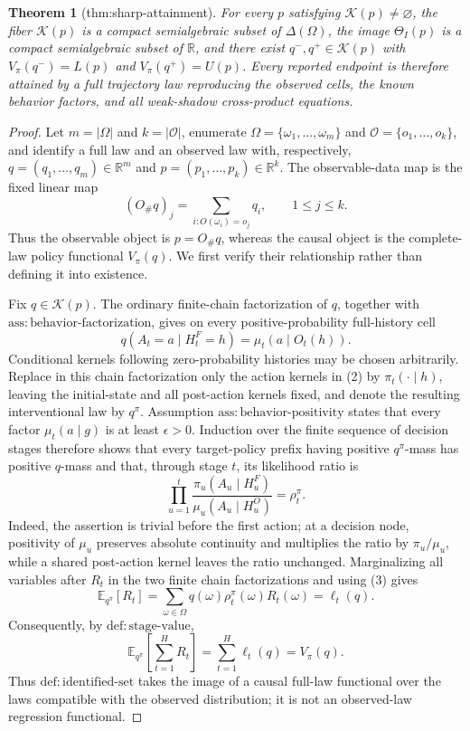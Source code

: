 \documentclass{article}
\newtheorem{theorem}{Theorem}
\begin{document}
\begin{theorem}[thm:sharp-attainment]\label{thm:sharp-attainment}
For every \(p\) satisfying \(\mathcal K(p)\ne\varnothing\), the fiber \(\mathcal K(p)\) is a compact semialgebraic subset of \(\Delta(\Omega)\), the image \(\Theta_I(p)\) is a compact semialgebraic subset of \(\mathbb R\), and there exist \(q^-,q^+\in\mathcal K(p)\) with \(V_\pi(q^-)=L(p)\) and \(V_\pi(q^+)=U(p)\). Every reported endpoint is therefore attained by a full trajectory law reproducing the observed cells, the known behavior factors, and all weak-shadow cross-product equations.
\end{theorem}
\begin{proof}
Let \(m=|\Omega|\) and \(k=|\mathcal O|\), enumerate \(\Omega=\{\omega_1,\ldots,\omega_m\}\) and \(\mathcal O=\{o_1,\ldots,o_k\}\), and identify a full law and an observed law with, respectively, \(q=(q_1,\ldots,q_m)\in\mathbb R^m\) and \(p=(p_1,\ldots,p_k)\in\mathbb R^k\).  The observable-data map is the fixed linear map
\[
 (O_\#q)_j=\sum_{i:O(\omega_i)=o_j}q_i,
 \qquad 1\leq j\leq k.
\tag{1}
\]
Thus the observable object is \(p=O_\#q\), whereas the causal object is the complete-law policy functional \(V_\pi(q)\).  We first verify their relationship rather than defining it into existence.

Fix \(q\in\mathcal K(p)\).  The ordinary finite-chain factorization of \(q\), together with \(\mathrm{ass{:}behavior\text{-}factorization}\), gives on every positive-probability full-history cell
\[
 q(A_t=a\mid H_t^F=h)=\mu_t(a\mid O_t(h)).
\tag{2}
\]
Conditional kernels following zero-probability histories may be chosen arbitrarily.  Replace in this chain factorization only the action kernels in (2) by \(\pi_t(\cdot\mid h)\), leaving the initial-state and all post-action kernels fixed, and denote the resulting interventional law by \(q^\pi\).  Assumption \(\mathrm{ass{:}behavior\text{-}positivity}\) states that every factor \(\mu_t(a\mid g)\) is at least \(\epsilon>0\).  Induction over the finite sequence of decision stages therefore shows that every target-policy prefix having positive \(q^\pi\)-mass has positive \(q\)-mass and that, through stage \(t\), its likelihood ratio is
\[
 \prod_{u=1}^t
 \frac{\pi_u(A_u\mid H_u^F)}{\mu_u(A_u\mid H_u^O)}
 =\rho_t^\pi.
\tag{3}
\]
Indeed, the assertion is trivial before the first action; at a decision node, positivity of \(\mu_u\) preserves absolute continuity and multiplies the ratio by \(\pi_u/\mu_u\), while a shared post-action kernel leaves the ratio unchanged.  Marginalizing all variables after \(R_t\) in the two finite chain factorizations and using (3) gives
\[
 \mathbb E_{q^\pi}[R_t]
 =\sum_{\omega\in\Omega}q(\omega)\rho_t^\pi(\omega)R_t(\omega)
 =\ell_t(q).
\tag{4}
\]
Consequently, by \(\mathrm{def{:}stage\text{-}value}\),
\[
 \mathbb E_{q^\pi}\!\left[\sum_{t=1}^H R_t\right]
 =\sum_{t=1}^H\ell_t(q)=V_\pi(q).
\tag{5}
\]
Thus \(\mathrm{def{:}identified\text{-}set}\) takes the image of a causal full-law functional over the laws compatible with the observed distribution; it is not an observed-law regression functional.


\end{proof}
\end{document}
